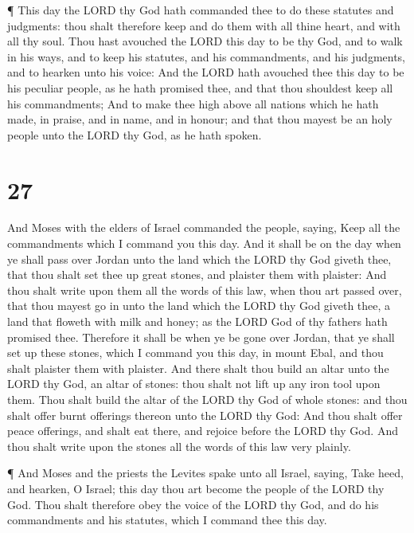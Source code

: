  ¶ This day the LORD thy God hath commanded thee to do
these statutes and judgments: thou shalt therefore keep and do them with
all thine heart, and with all thy soul.  Thou hast avouched
the LORD this day to be thy God, and to walk in his ways, and to keep
his statutes, and his commandments, and his judgments, and to hearken
unto his voice:  And the LORD hath avouched thee this day
to be his peculiar people, as he hath promised thee, and that thou
shouldest keep all his commandments;  And to make thee high
above all nations which he hath made, in praise, and in name, and in
honour; and that thou mayest be an holy people unto the LORD thy God, as
he hath spoken.

\hypertarget{section-26}{%
\section{27}\label{section-26}}

 And Moses with the elders of Israel commanded the people,
saying, Keep all the commandments which I command you this day.
 And it shall be on the day when ye shall pass over Jordan
unto the land which the LORD thy God giveth thee, that thou shalt set
thee up great stones, and plaister them with plaister:  And
thou shalt write upon them all the words of this law, when thou art
passed over, that thou mayest go in unto the land which the LORD thy God
giveth thee, a land that floweth with milk and honey; as the LORD God of
thy fathers hath promised thee.  Therefore it shall be when
ye be gone over Jordan, that ye shall set up these stones, which I
command you this day, in mount Ebal, and thou shalt plaister them with
plaister.  And there shalt thou build an altar unto the LORD
thy God, an altar of stones: thou shalt not lift up any iron tool upon
them.  Thou shalt build the altar of the LORD thy God of
whole stones: and thou shalt offer burnt offerings thereon unto the LORD
thy God:  And thou shalt offer peace offerings, and shalt
eat there, and rejoice before the LORD thy God.  And thou
shalt write upon the stones all the words of this law very plainly.

 ¶ And Moses and the priests the Levites spake unto all
Israel, saying, Take heed, and hearken, O Israel; this day thou art
become the people of the LORD thy God.  Thou shalt
therefore obey the voice of the LORD thy God, and do his commandments
and his statutes, which I command thee this day.

